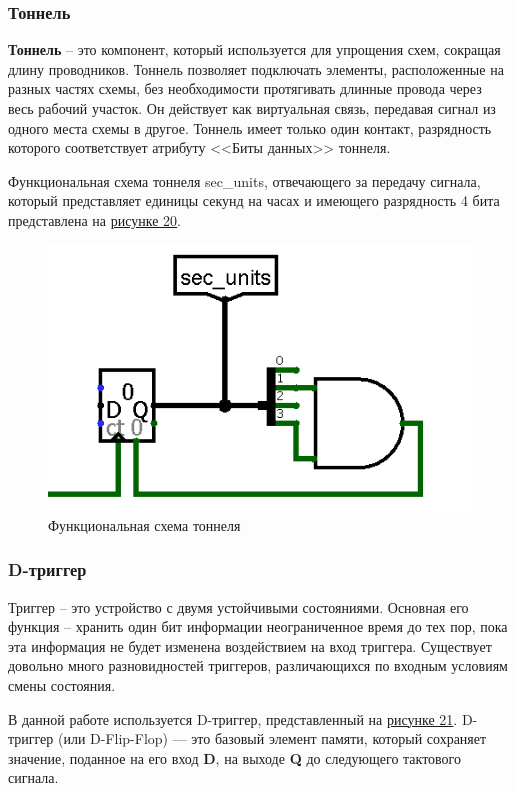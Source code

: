 \documentclass[11pt,a4paper,final]{article} %
\begin{document}
\newpage

\subsubsection{Тоннель}

\textbf{Тоннель} -- это компонент, который используется для упрощения схем, сокращая длину проводников. Тоннель позволяет подключать элементы, расположенные на разных частях схемы, без необходимости протягивать длинные провода через весь рабочий участок. Он действует как виртуальная связь, передавая сигнал из одного места схемы в другое. Тоннель имеет только один контакт, разрядность которого соответствует атрибуту <<Биты данных>> тоннеля.

Функциональная схема тоннеля sec\_units, отвечающего за передачу сигнала, который представляет единицы секунд на часах и имеющего разрядность 4 бита представлена на \hyperref[fig:tunnel]{рисунке 20}.

\begin{figure}[H]
	\centering
	\includegraphics[width=0.55 \linewidth]{img/tunnel.png}
	\caption{Функциональная схема тоннеля}
	\label{fig:tunnel}
\end{figure}


\subsubsection{D-триггер}

Триггер -- это устройство с двумя устойчивыми состояниями. Основная его функция -- хранить один бит информации неограниченное время до тех пор, пока эта информация не будет изменена воздействием на вход триггера. Существует довольно много разновидностей триггеров, различающихся по входным условиям смены состояния. 
 
В данной работе используется D-триггер, представленный на \hyperref[fig:trigger]{рисунке 21}. D-триггер (или D-Flip-Flop) — это базовый элемент памяти, который сохраняет значение, поданное на его вход \textbf{D}, на выходе \textbf{Q} до следующего тактового сигнала. 
\end{document}
